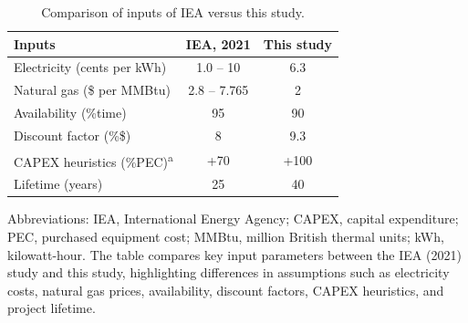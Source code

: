 \documentclass{article}
\begin{document}
\begin{table}[H]
  \centering
  \caption{Comparison of inputs of IEA versus this study.}
  \label{table:SI_EIA_vs_APIRA} %
  \begin{threeparttable}
    \begin{tabular}{@{}lcc@{}}
      \toprule
      \textbf{Inputs} & \textbf{IEA, 2021} & \textbf{This study} \\ \midrule
      Electricity (cents per kWh) & 1.0 – 10 & 6.3 \\ 
      Natural gas (\$ per MMBtu) & 2.8 – 7.765 & 2 \\ 
      Availability (\%time) & 95 & 90 \\ 
      Discount factor (\%\$) & 8 & 9.3 \\ 
      CAPEX heuristics (\%PEC)\textsuperscript{a} & +70 & +100 \\ 
      Lifetime (years) & 25 & 40 \\ \bottomrule
    \end{tabular}
\begin{tablenotes}
  \small
  \item Abbreviations: IEA, International Energy Agency; CAPEX, capital expenditure; PEC, purchased equipment cost; MMBtu, million British thermal units; kWh, kilowatt-hour. The table compares key input parameters between the IEA (2021) study and this study, highlighting differences in assumptions such as electricity costs, natural gas prices, availability, discount factors, CAPEX heuristics, and project lifetime.
\end{tablenotes}

  \end{threeparttable}
\end{table}

\renewcommand{\refname}{Supplementary References}


\end{document}

